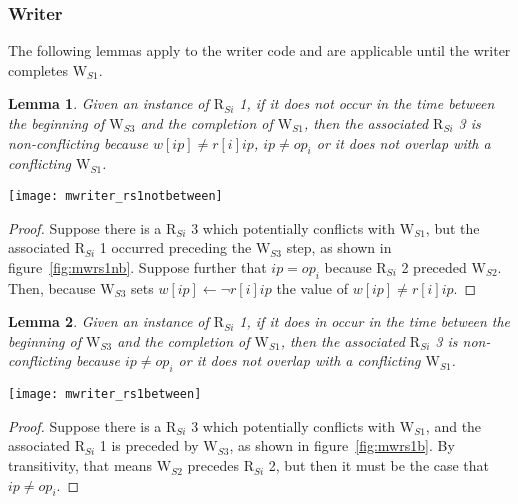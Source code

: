 \documentclass{article}
\newtheorem{lemma}{Lemma}
\newcommand\RS[1]{\ensuremath{\text{R}_{S#1}}}
\newcommand\WS[1]{\ensuremath{\text{W}_{S#1}}}
\newcommand\W[1]{\ensuremath{w\left[#1\right]}}
\newcommand\R[1]{\ensuremath{r\left[#1\right]}}
\newcommand\ip{\ensuremath{ip}}
\newcommand\op{\ensuremath{op}}
\begin{document}
\subsubsection{Writer}

The following lemmas apply to the writer code and are applicable until
the writer completes \WS1.

\begin{lemma}\label{lma:mrs1notbetween}
  Given an instance of \RS i 1, if it does not occur in the time between
  the beginning of \WS3 and the completion of \WS1, then the
  associated \RS i 3 is non-conflicting because $\W{\ip}\neq\R{i}{\ip}$,
  $\ip\neq\op_i$ or it does not overlap with a conflicting \WS1.
\end{lemma}

\begin{figure*}[h]
  \centering
  \texttt{[image: mwriter\_rs1notbetween]}
  \caption{\RS i 1 does not occur between \WS 3 and completion of \WS 1}
  \label{fig:mwrs1nb}
\end{figure*}

\begin{proof}
  Suppose there is a \RS i 3 which potentially conflicts with \WS1, but
  the associated \RS i 1 occurred preceding the \WS3 step, as shown in
  figure~\ref{fig:mwrs1nb}. Suppose further that $\ip=\op_i$ because \RS i 2
  preceded \WS2. Then, because \WS3 sets $\W{\ip}\gets\neg\R i {\ip}$ the
  value of $\W{\ip}\neq\R i {\ip}$.
\end{proof}

\begin{lemma}\label{lma:mrs1between}
  Given an instance of \RS i 1, if it does in occur in the time
  between the beginning of \WS3 and the completion of \WS1, then the
  associated \RS i 3 is non-conflicting because $\ip\neq\op_i$ or it
  does not overlap with a conflicting \WS1.
\end{lemma}

\begin{figure*}[h]
  \centering
  \texttt{[image: mwriter\_rs1between]}
  \caption{\RS i 1 occurs at least once between \WS3 and completion of \WS1, as well as a case where $\op_i=\ip$}
  \label{fig:mwrs1b}
\end{figure*}

\begin{proof}
  Suppose there is a \RS i 3 which potentially conflicts with \WS1, and
  the associated \RS i 1 is preceded by \WS3, as shown in
  figure~\ref{fig:mwrs1b}. By transitivity, that means \WS2 precedes
  \RS i 2, but then it must be the case that $\ip\neq\op_i$.
\end{proof}
\end{document}
